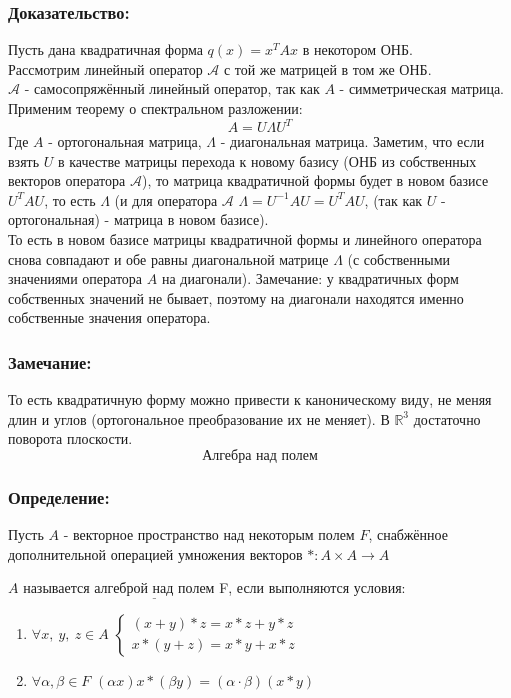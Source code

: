 \documentclass[12pt, letterpaper, twoside]{article}
\newcommand{\Underl}[1]{$\underline{\text{#1}}$}
\newcommand{\mb}[1]{\mathbb{#1}}
\begin{document}
    \subsubsection*{Доказательство:}
    Пусть дана квадратичная форма $q(x) = x^T A x$ в некотором ОНБ.\\
    Рассмотрим линейный оператор $\mathcal{A}$ с той же матрицей в том же ОНБ.\\
    $\mathcal{A}$ - самосопряжённый линейный оператор, так как $A$ - симметрическая матрица. Применим теорему о спектральном разложении:
    \[A = U \Lambda U^T\]
    Где $A$ - ортогональная матрица, $\Lambda$ - диагональная матрица. Заметим, что если взять $U$ в качестве матрицы перехода к новому базису (ОНБ из собственных векторов оператора $\mathcal{A}$), то матрица квадратичной формы будет в новом базисе $U^T A U$, то есть $\Lambda$ (и для оператора $\mathcal{A}$ $\Lambda = U^{-1} A U = U^T A U$, (так как $U$ - ортогональная) - матрица в новом базисе).\\
    То есть в новом базисе матрицы квадратичной формы и линейного оператора снова совпадают и обе равны диагональной матрице $\Lambda$ (с собственными значениями оператора $A$ на диагонали). Замечание: у квадратичных форм собственных значений не бывает, поэтому на диагонали находятся именно собственные значения оператора.

    \subsubsection*{Замечание:}
    То есть квадратичную форму можно привести к каноническому виду, не меняя длин и углов (ортогональное преобразование их не меняет). В $\mb{R}^3$ достаточно поворота плоскости.
    \newpage
    \[\textbf{Алгебра над полем}\]
    
    \subsubsection*{Определение:}
    Пусть $A$ - векторное пространство над некоторым полем $F$, снабжённое дополнительной операцией умножения векторов $*: A\times A \longrightarrow A$\par
    $A$ называется \Underl{алгеброй над полем} F, если выполняются условия:
    \begin{enumerate}
        \item $\forall x,\ y,\ z\in A$ $\begin{cases}
            (x + y)*z = x*z + y*z\\
            x*(y + z) = x*y + x*z
        \end{cases}$
        \item $\forall \alpha, \beta \in F$ $(\alpha x) x * (\beta y) = (\alpha \cdot \beta)(x * y)$
    \end{enumerate}
\end{document}
